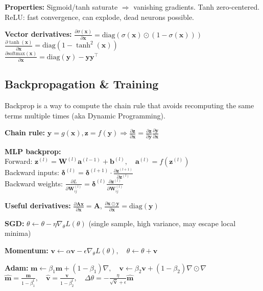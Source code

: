 \textbf{Properties:} Sigmoid/tanh saturate $\Rightarrow$ vanishing gradients. Tanh zero-centered. ReLU: fast convergence, can explode, dead neurons possible.

\textbf{Vector derivatives:}
$\frac{\partial \sigma(\mathbf{x})}{\partial \mathbf{x}} = \text{diag}(\sigma(\mathbf{x}) \odot (1 - \sigma(\mathbf{x})))$\\
$\frac{\partial \tanh(\mathbf{x})}{\partial \mathbf{x}} = \text{diag}(1 - \tanh^2(\mathbf{x}))$\\
$\frac{\partial \text{softmax}(\mathbf{x})}{\partial \mathbf{x}} = \text{diag}(\mathbf{y}) - \mathbf{y}\mathbf{y}^\top$

\subsection{Backpropagation \& Training}

Backprop is a way to compute the chain rule that avoids recomputing the same terms multiple times (aka Dynamic Programming).

\textbf{Chain rule:} $\mathbf{y} = g(\mathbf{x}), \mathbf{z} = f(\mathbf{y}) \Rightarrow \frac{\partial \mathbf{z}}{\partial \mathbf{x}} = \frac{\partial \mathbf{z}}{\partial \mathbf{y}} \frac{\partial \mathbf{y}}{\partial \mathbf{x}}$

\textbf{MLP backprop:}\\
Forward: $\mathbf{z}^{(l)} = \mathbf{W}^{(l)} \mathbf{a}^{(l-1)} + \mathbf{b}^{(l)}, \quad \mathbf{a}^{(l)} = f(\mathbf{z}^{(l)})$\\
Backward inputs: $\boldsymbol{\delta}^{(l)} = \boldsymbol{\delta}^{(l+1)} \cdot \frac{\partial \mathbf{z}^{(l+1)}}{\partial \mathbf{z}^{(l)}}$\\
Backward weights: $\frac{\partial L}{\partial \mathbf{W}_{ij}^{(l)}} = \boldsymbol{\delta}^{(l)} \frac{\partial \mathbf{z}^{(l)}}{\partial \mathbf{W}_{ij}^{(l)}}$

\textbf{Useful derivatives:} $\frac{\partial \mathbf{A}\mathbf{x}}{\partial \mathbf{x}} = \mathbf{A}$, $\frac{\partial \mathbf{x} \odot \mathbf{y}}{\partial \mathbf{x}} = \text{diag}(\mathbf{y})$

\textbf{SGD:} $\theta \leftarrow \theta - \eta \nabla_\theta L(\theta)$ (single sample, high variance, may escape local minima)

\textbf{Momentum:} $\mathbf{v} \leftarrow \alpha \mathbf{v} - \epsilon \nabla_\theta L(\theta), \quad \theta \leftarrow \theta + \mathbf{v}$

\textbf{Adam:} 
{ \small
$\mathbf{m} \leftarrow \beta_1 \mathbf{m} + (1-\beta_1) \nabla, \quad \mathbf{v} \leftarrow \beta_2 \mathbf{v} + (1-\beta_2) \nabla \odot \nabla$ 
$\hat{\mathbf{m}} = \frac{\mathbf{m}}{1-\beta_1^t}, \quad \hat{\mathbf{v}} = \frac{\mathbf{v}}{1-\beta_2^t}, \quad \Delta\theta = -\frac{\eta}{\sqrt{\hat{\mathbf{v}}} + \epsilon}\hat{\mathbf{m}}$}

